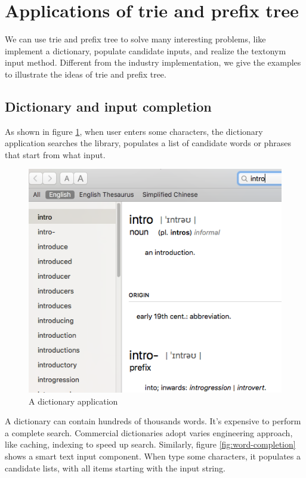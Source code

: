 \documentclass[b5paper]{article}
\begin{document}
\section{Applications of trie and prefix tree}
We can use trie and prefix tree to solve many interesting problems, like implement a dictionary, populate candidate inputs, and realize the textonym input method. Different from the industry implementation, we give the examples to illustrate the ideas of trie and prefix tree.

\subsection{Dictionary and input completion}
As shown in figure \ref{fig:e-dict}, when user enters some characters, the dictionary application searches the library, populates a list of candidate words or phrases that start from what input.

\begin{figure}[htbp]
  \centering
  \includegraphics[scale=0.4]{img/edict-en}
  \caption{A dictionary application}
  \label{fig:e-dict}
\end{figure}

A dictionary can contain hundreds of thousands words. It's expensive to perform a complete search. Commercial dictionaries adopt varies engineering approach, like caching, indexing to speed up search. Similarly, figure \ref{fig:word-completion} shows a smart text input component. When type some characters, it populates a candidate lists, with all items starting with the input string.
\end{document}
